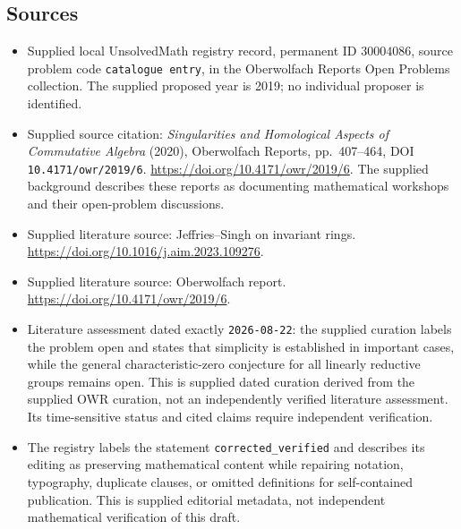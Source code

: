 \documentclass[11pt]{article}
\begin{document}
\subsection{Sources}
\begin{itemize}
\item Supplied local UnsolvedMath registry record, permanent ID \(30004086\), source problem code \texttt{catalogue entry}, in the Oberwolfach Reports Open Problems collection. The supplied proposed year is 2019; no individual proposer is identified.
\item Supplied source citation: \emph{Singularities and Homological Aspects of Commutative Algebra} (2020), Oberwolfach Reports, pp.\ 407--464, DOI \texttt{10.4171/owr/2019/6}. \url{https://doi.org/10.4171/owr/2019/6}. The supplied background describes these reports as documenting mathematical workshops and their open-problem discussions.
\item Supplied literature source: Jeffries--Singh on invariant rings. \url{https://doi.org/10.1016/j.aim.2023.109276}.
\item Supplied literature source: Oberwolfach report. \url{https://doi.org/10.4171/owr/2019/6}.
\item Literature assessment dated exactly \texttt{2026-08-22}: the supplied curation labels the problem open and states that simplicity is established in important cases, while the general characteristic-zero conjecture for all linearly reductive groups remains open. This is supplied dated curation derived from the supplied OWR curation, not an independently verified literature assessment. Its time-sensitive status and cited claims require independent verification.
\item The registry labels the statement \texttt{corrected\_verified} and describes its editing as preserving mathematical content while repairing notation, typography, duplicate clauses, or omitted definitions for self-contained publication. This is supplied editorial metadata, not independent mathematical verification of this draft.
\end{itemize}
\end{document}
